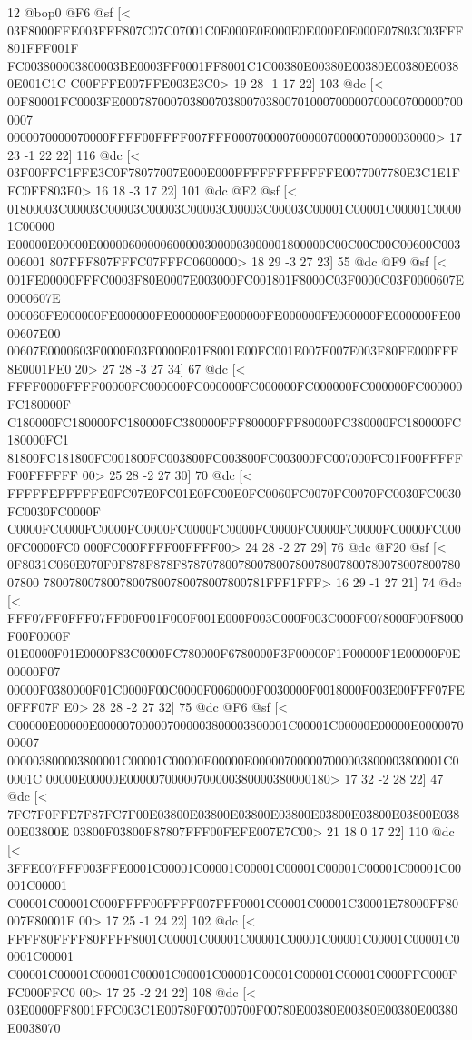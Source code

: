 {{{{{{{{{{{{{{{{{{{{{{{{{{{{{{{{{{{{{{{{{{{{{{{{{{{{{{{{{{{{{{{{{{{{{{{{{{{{{{{{{{12 @bop0
@F6 @sf
[<
03F8000FFE003FFF807C07C07001C0E000E0E000E0E000E0E000E07803C03FFF801FFF001F
FC003800003800003BE0003FF0001FF8001C1C00380E00380E00380E00380E00380E001C1C
C00FFFE007FFE003E3C0>
	 19 28 -1 17 22] 103 @dc
[<
00F80001FC0003FE0007870007038007038007038007010007000007000007000007000007
0000070000070000FFFF00FFFF007FFF00070000070000070000070000030000>
	 17 23 -1 22 22] 116 @dc
[<
03F00FFC1FFE3C0F78077007E000E000FFFFFFFFFFFFE0077007780E3C1E1FFC0FF803E0>
	 16 18 -3 17 22] 101 @dc
@F2 @sf
[<
01800003C00003C00003C00003C00003C00003C00003C00001C00001C00001C00001C00000
E00000E00000E000006000006000003000003000001800000C00C00C00C00600C003006001
807FFF807FFFC07FFFC0600000>
	 18 29 -3 27 23] 55 @dc
@F9 @sf
[<
001FE00000FFFC0003F80E0007E003000FC001801F8000C03F0000C03F0000607E0000607E
000060FE000000FE000000FE000000FE000000FE000000FE000000FE000000FE0000607E00
00607E0000603F0000E03F0000E01F8001E00FC001E007E007E003F80FE000FFF8E0001FE0
20>
	 27 28 -3 27 34] 67 @dc
[<
FFFF0000FFFF00000FC000000FC000000FC000000FC000000FC000000FC000000FC180000F
C180000FC180000FC180000FC380000FFF80000FFF80000FC380000FC180000FC180000FC1
81800FC181800FC001800FC003800FC003800FC003000FC007000FC01F00FFFFFF00FFFFFF
00>
	 25 28 -2 27 30] 70 @dc
[<
FFFFFEFFFFFE0FC07E0FC01E0FC00E0FC0060FC0070FC0070FC0030FC0030FC0030FC0000F
C0000FC0000FC0000FC0000FC0000FC0000FC0000FC0000FC0000FC0000FC0000FC0000FC0
000FC000FFFF00FFFF00>
	 24 28 -2 27 29] 76 @dc
@F20 @sf
[<
0F8031C060E070F0F878F878F8787078007800780078007800780078007800780078007800
78007800780078007800780078007800781FFF1FFF>
	 16 29 -1 27 21] 74 @dc
[<
FFF07FF0FFF07FF00F001F000F001E000F003C000F003C000F0078000F00F8000F00F0000F
01E0000F01E0000F83C0000FC780000F6780000F3F00000F1F00000F1E00000F0E00000F07
00000F0380000F01C0000F00C0000F0060000F0030000F0018000F003E00FFF07FE0FFF07F
E0>
	 28 28 -2 27 32] 75 @dc
@F6 @sf
[<
C00000E00000E000007000007000003800003800001C00001C00000E00000E000007000007
000003800003800001C00001C00000E00000E000007000007000003800003800001C00001C
00000E00000E00000700000700000380000380000180>
	 17 32 -2 28 22] 47 @dc
[<
7FC7F0FFE7F87FC7F00E03800E03800E03800E03800E03800E03800E03800E03800E03800E
03800F03800F87807FFF00FEFE007E7C00>
	 21 18 0 17 22] 110 @dc
[<
3FFE007FFF003FFE0001C00001C00001C00001C00001C00001C00001C00001C00001C00001
C00001C00001C000FFFF00FFFF007FFF0001C00001C00001C30001E78000FF80007F80001F
00>
	 17 25 -1 24 22] 102 @dc
[<
FFFF80FFFF80FFFF8001C00001C00001C00001C00001C00001C00001C00001C00001C00001
C00001C00001C00001C00001C00001C00001C00001C00001C00001C000FFC000FFC000FFC0
00>
	 17 25 -2 24 22] 108 @dc
[<
03E0000FF8001FFC003C1E00780F00700700F00780E00380E00380E00380E00380E0038070
}}}}}}}}}}}}}}}}}}}}}}}}}}}}}}}}}}}}}}}}}}}}}}}}}}}}}}}}}}}}}}}}}}}}}}}}}}}}}}}}}}
